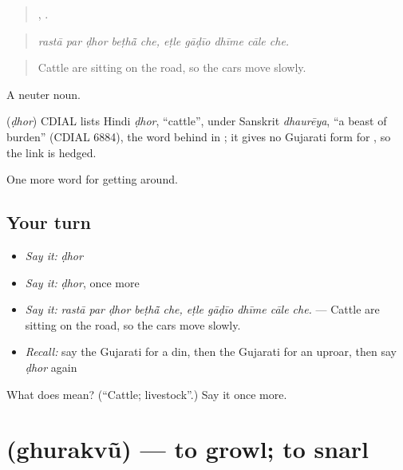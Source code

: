 \begin{quote}
    ,     .
\end{quote}

\begin{quote}
\emph{rastā par ḍhor beṭhā̃ che, eṭle gāḍīo dhīme cāle che.}
\end{quote}

\begin{quote}
Cattle are sitting on the road, so the cars move slowly.
\end{quote}

A neuter noun.

\begin{cousinweb}
\textbf{} (\emph{ḍhor}) CDIAL lists Hindi \emph{ḍhor}, \textquotedblleft{}cattle\textquotedblright{}, under Sanskrit \emph{dhaurēya}, \textquotedblleft{}a beast of burden\textquotedblright{} (CDIAL 6884), the word behind  in ; it gives no Gujarati form for , so the link is hedged.
\end{cousinweb}

\begin{grammarlens}[title={What you've built}]
One more word for getting around.
\end{grammarlens}

\subsection*{Your turn}
\begin{itemize}
\raggedright
  \item \emph{Say it:} \emph{ḍhor}
  \item \emph{Say it:} \emph{ḍhor}, once more
  \item \emph{Say it:} \emph{rastā par ḍhor beṭhā̃ che, eṭle gāḍīo dhīme cāle che.} — Cattle are sitting on the road, so the cars move slowly.
  \item \emph{Recall:} say the Gujarati for a din, then the Gujarati for an uproar, then say \emph{ḍhor} again
\end{itemize}

\begin{tcolorbox}[breakable,colback=teal!4,colframe=teal!35!black,title={Before you move on}]
What does  mean? (\textquotedblleft{}Cattle; livestock\textquotedblright{}.) Say it once more.
\end{tcolorbox}
\section[\texorpdfstring{\gu{ઘુરકવું} (ghurakvũ)}{ઘુરકવું (ghurakvũ)}]{ (ghurakvũ) — to growl; to snarl}

